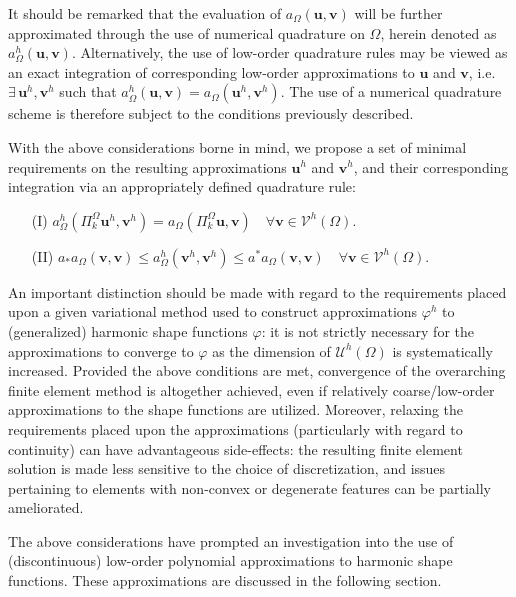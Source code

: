 	It should be remarked that the evaluation of $a_{\Omega}(\mathbf{u},\mathbf{v})$ will be further approximated through the use of numerical quadrature on $\Omega$, herein denoted as $a^h_{\Omega}(\mathbf{u},\mathbf{v})$. Alternatively, the use of low-order quadrature rules may be viewed as an exact integration of corresponding low-order approximations to $\mathbf{u}$ and $\mathbf{v}$, i.e. $\exists \, \mathbf{u}^h,\mathbf{v}^h$ such that $a^h_{\Omega}(\mathbf{u},\mathbf{v}) = a_{\Omega}(\mathbf{u}^h,\mathbf{v}^h)$. The use of a numerical quadrature scheme is therefore subject to the conditions previously described.
	
	With the above considerations borne in mind, we propose a set of minimal requirements on the resulting approximations $\mathbf{u}^h$ and $\mathbf{v}^h$, and their corresponding integration via an appropriately defined quadrature rule:
	\begin{itemize}
		\item[(I)] $a^h_{\Omega}(\Pi^{\Omega}_k \mathbf{u}^h,\mathbf{v}^h) = a_{\Omega}(\Pi^{\Omega}_k \mathbf{u},\mathbf{v}) \quad \forall \mathbf{v} \in \mathcal{V}^h (\Omega)$.
		\item[(II)] $a_* a_{\Omega} (\mathbf{v},\mathbf{v}) \leq a^h_{\Omega} (\mathbf{v}^h,\mathbf{v}^h) \leq a^* a_{\Omega} (\mathbf{v},\mathbf{v}) \quad \forall \mathbf{v} \in \mathcal{V}^h (\Omega).$
	\end{itemize}
	
	An important distinction should be made with regard to the requirements placed upon a given variational method used to construct approximations $\varphi^h$ to (generalized) harmonic shape functions $\varphi$: it is not strictly necessary for the approximations to converge to $\varphi$ as the dimension of $\mathcal{U}^h (\Omega)$ is systematically increased. Provided the above conditions are met, convergence of the overarching finite element method is altogether achieved, even if relatively coarse/low-order approximations to the shape functions are utilized. Moreover, relaxing the requirements placed upon the approximations (particularly with regard to continuity) can have advantageous side-effects: the resulting finite element solution is made less sensitive to the choice of discretization, and issues pertaining to elements with non-convex or degenerate features can be partially ameliorated.
	
	The above considerations have prompted an investigation into the use of (discontinuous) low-order polynomial approximations to harmonic shape functions. These approximations are discussed in the following section.
	
